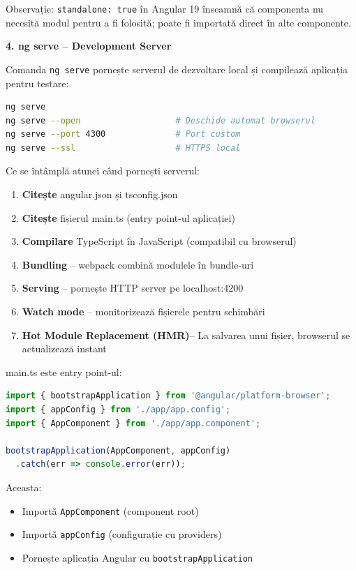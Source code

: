 Observație: \texttt{standalone: true} în Angular 19 înseamnă că componenta nu necesită modul pentru a fi folosită; poate fi importată direct în alte componente.

\textbf{4. ng serve – Development Server}

Comanda \texttt{ng serve} pornește serverul de dezvoltare local și compilează aplicația pentru testare:

\begin{lstlisting}[language=bash]
ng serve
ng serve --open                   # Deschide automat browserul
ng serve --port 4300              # Port custom
ng serve --ssl                    # HTTPS local
\end{lstlisting}

Ce se întâmplă atunci când pornești serverul:

\begin{enumerate}
  \item \textbf{Citește} angular.json și tsconfig.json
  \item \textbf{Citește} fișierul main.ts (entry point-ul aplicației)
  \item \textbf{Compilare} TypeScript în JavaScript (compatibil cu browserul)
  \item \textbf{Bundling} – webpack combină modulele în bundle-uri
  \item \textbf{Serving} – pornește HTTP server pe localhost:4200
  \item \textbf{Watch mode} – monitorizează fișierele pentru schimbări
  \item \textbf{Hot Module Replacement (HMR)}– La salvarea unui fișier, browserul se actualizează instant
\end{enumerate}

main.ts este entry point-ul:

\begin{lstlisting}[language=TypeScript]
import { bootstrapApplication } from '@angular/platform-browser';
import { appConfig } from './app/app.config';
import { AppComponent } from './app/app.component';

bootstrapApplication(AppComponent, appConfig)
  .catch(err => console.error(err));
\end{lstlisting}

Aceasta:
\begin{itemize}
  \item Importă \texttt{AppComponent} (component root)
  \item Importă \texttt{appConfig} (configurație cu providers)
  \item Pornește aplicația Angular cu \texttt{bootstrapApplication}
\end{itemize}

